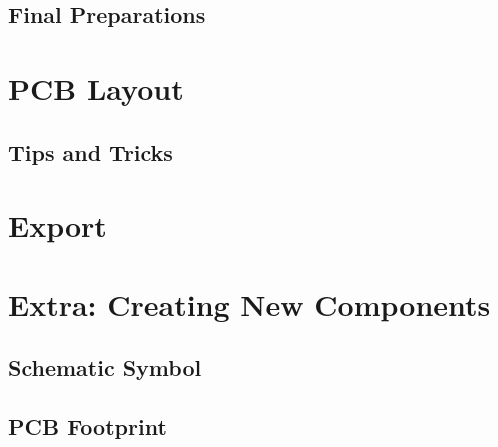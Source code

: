 \documentclass[12pt, oneside]{article}
\begin{document}
\subsection{Final Preparations}


\section{PCB Layout}
\subsection{Tips and Tricks}

\section{Export}

\section{Extra: Creating New Components}
\subsection{Schematic Symbol}

\subsection{PCB Footprint}
\end{document}
